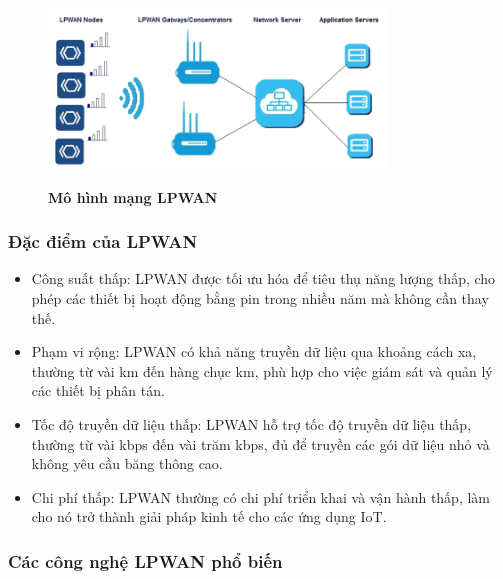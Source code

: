 \documentclass{article} %
\begin{document}
	\begin{figure}[!ht]
		\centering
		\includegraphics[width=9cm,height=5cm]{Images/LPWANAPP.png}
		\caption[Mô hình mạng LPWAN \cite{chaudhari2020lpwan}]{\bfseries \fontsize{12pt}{0pt}\selectfont Mô hình mạng LPWAN \cite{chaudhari2020lpwan}}
		\label{LPWANAPP}
	\end{figure}
	\subsubsection{Đặc điểm của LPWAN}
	
	\begin{itemize}
		\item Công suất thấp: LPWAN được tối ưu hóa để tiêu thụ năng lượng thấp, cho phép các thiết bị hoạt động bằng pin trong nhiều năm mà không cần thay thế.
		\item Phạm vi rộng: LPWAN có khả năng truyền dữ liệu qua khoảng cách xa, thường từ vài km đến hàng chục km, phù hợp cho việc giám sát và quản lý các thiết bị phân tán.
		\item Tốc độ truyền dữ liệu thấp: LPWAN hỗ trợ tốc độ truyền dữ liệu thấp, thường từ vài kbps đến vài trăm kbps, đủ để truyền các gói dữ liệu nhỏ và không yêu cầu băng thông cao.
		\item Chi phí thấp: LPWAN thường có chi phí triển khai và vận hành thấp, làm cho nó trở thành giải pháp kinh tế cho các ứng dụng IoT.
	\end{itemize}
	
	\subsubsection{Các công nghệ LPWAN phổ biến}
	
\end{document}
